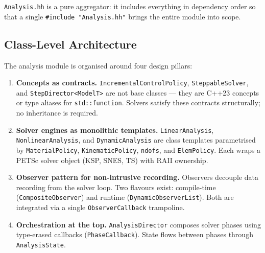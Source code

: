 \begin{center}
\end{center}

\texttt{Analysis.hh} is a pure aggregator: it includes everything in
dependency order so that a single \texttt{\#include "Analysis.hh"} brings
the entire module into scope.


\subsection{Class-Level Architecture}
\label{sec:arch:analysis:classes}

The analysis module is organised around four design pillars:

\begin{enumerate}
  \item \textbf{Concepts as contracts.}
        \texttt{IncrementalControlPolicy}, \texttt{SteppableSolver},
        and \texttt{StepDirector<ModelT>} are not base classes ---
        they are C++23 concepts or type aliases for \texttt{std::function}.
        Solvers satisfy these contracts structurally; no inheritance is
        required.

  \item \textbf{Solver engines as monolithic templates.}
        \texttt{LinearAnalysis}, \texttt{NonlinearAnalysis}, and
        \texttt{DynamicAnalysis} are class templates parametrised by
        \texttt{MaterialPolicy}, \texttt{KinematicPolicy}, \texttt{ndofs},
        and \texttt{ElemPolicy}.  Each wraps a PETSc solver object (KSP,
        SNES, TS) with RAII ownership.

  \item \textbf{Observer pattern for non-intrusive recording.}
        Observers decouple data recording from the solver loop.  Two
        flavours exist: compile-time (\texttt{CompositeObserver}) and
        runtime (\texttt{DynamicObserverList}).  Both are integrated via
        a single \texttt{ObserverCallback} trampoline.

  \item \textbf{Orchestration at the top.}
        \texttt{AnalysisDirector} composes solver phases using
        type-erased callbacks (\texttt{PhaseCallback}).  State flows
        between phases through \texttt{AnalysisState}.
\end{enumerate}


